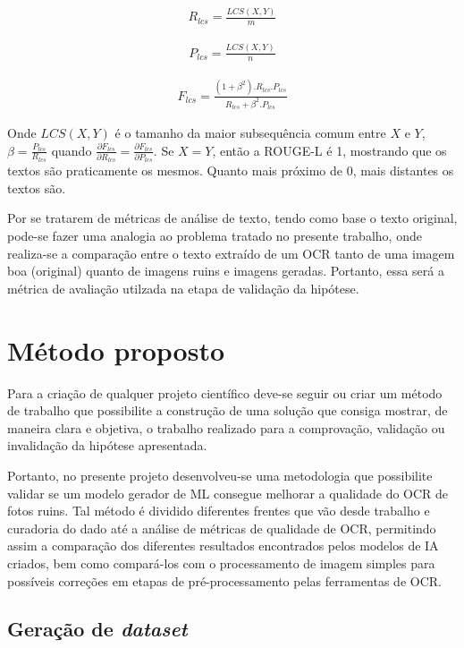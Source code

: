 \begin{gather}
  R_{lcs} = \frac{LCS(X, Y)}{m}
\end{gather}

\begin{gather}
  P_{lcs} = \frac{LCS(X, Y)}{n}
\end{gather}

\begin{gather}
  F_{lcs} = \frac{(1 + \beta^2).R_{lcs} . P_{lcs}}{R_{lcs} + \beta^2.P_{lcs} }
\end{gather}

Onde \(LCS(X, Y)\) é o tamanho da maior subsequência comum entre $X$ e $Y$, \(\beta = \frac{P_{lcs}}{R_{lcs}}\) quando \(\frac{\partial F_{lcs}}{\partial R_{lcs}} = \frac{\partial F_{lcs}}{\partial P_{lcs}}\). Se \(X = Y\), então a ROUGE-L é 1, mostrando que os textos são praticamente os mesmos. Quanto mais próximo de 0, mais distantes os textos são.

\ornament

Por se tratarem de métricas de análise de texto, tendo como base o texto original, pode-se fazer uma analogia ao problema tratado no presente trabalho, onde realiza-se a comparação entre o texto extraído de um OCR tanto de uma imagem boa (original) quanto de imagens ruins e imagens geradas. Portanto, essa será a métrica de avaliação utilzada na etapa de validação da hipótese.

\section{Método proposto}

Para a criação de qualquer projeto científico deve-se seguir ou criar um método de trabalho que possibilite a construção de uma solução que consiga mostrar, de maneira clara e objetiva, o trabalho realizado para a comprovação, validação ou invalidação da hipótese apresentada.

Portanto, no presente projeto desenvolveu-se uma metodologia que possibilite validar se um modelo gerador de ML consegue melhorar a qualidade do OCR de fotos ruins. Tal método é dividido diferentes frentes que vão desde trabalho e curadoria do dado até a análise de métricas de qualidade de OCR, permitindo assim a comparação dos diferentes resultados encontrados pelos modelos de IA criados, bem como compará-los com o processamento de imagem simples para possíveis correções em etapas de pré-processamento pelas ferramentas de OCR.

\subsection{Geração de \textit{dataset}}

